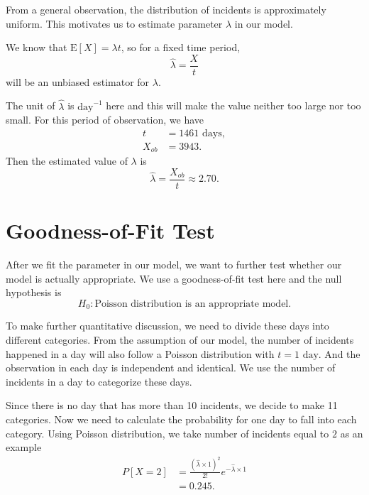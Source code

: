 \documentclass[11pt,a4paper,english]{article}
\begin{document}
From a general observation, the distribution of incidents is approximately uniform. This motivates us to estimate parameter $\lambda$ in our model.

We know that $\text{E}[X] = \lambda t$, so for a fixed time period,
\begin{equation*}
	\hat{\lambda} = \frac{X}{t}
\end{equation*}
will be an unbiased estimator for $\lambda$.

The unit of $\hat{\lambda}$ is $\text{day}^{-1}$ here and this will make the value neither too large nor too small. For this period of observation, we have 
\begin{align*}
	t &= 1461\text{ days},\\
	X_{ob} &= 3943.
\end{align*}
Then the estimated value of $\lambda$ is
\begin{equation*}
	\hat{\lambda} = \frac{X_{ob}}{t} \approx 2.70.
\end{equation*}

\section{Goodness-of-Fit Test}
After we fit the parameter in our model, we want to further test whether our model is actually appropriate. We use a goodness-of-fit test here and the null hypothesis is
\begin{equation*}
	H_{0}:\text{Poisson distribution is an appropriate model.}
\end{equation*}

To make further quantitative discussion, we need to divide these days into different categories. 
From the assumption of our model, the number of incidents happened in a day will also follow a Poisson distribution with $t = 1\text{ day}$. 
And the observation in each day is independent and identical. We use the number of incidents in a day to categorize these days.

Since there is no day that has more than 10 incidents, we decide to make 11 categories. Now we need to calculate the probability for one day to fall into each category. Using Poisson distribution, we take number of incidents equal to $2$ as an example
\begin{align*}
	P[X = 2] &= \frac{\left(\hat{\lambda}\times 1\right)^{2}}{2!}
	e^{-\hat{\lambda} \times 1} \\
	&= 0.245.\\
\end{align*}
\end{document}
